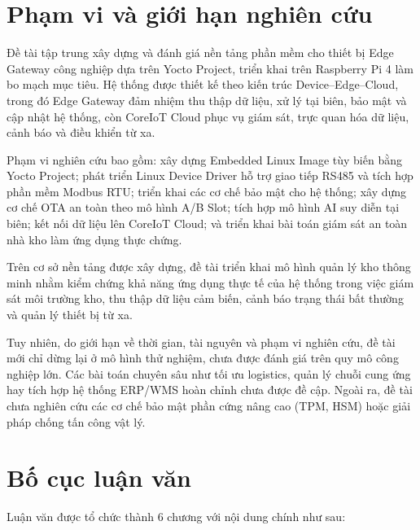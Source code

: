 \section{Phạm vi và giới hạn nghiên cứu}

Đề tài tập trung xây dựng và đánh giá nền tảng phần mềm cho thiết bị Edge Gateway công nghiệp dựa trên Yocto Project, triển khai trên Raspberry Pi 4 làm bo mạch mục tiêu. Hệ thống được thiết kế theo kiến trúc Device–Edge–Cloud, trong đó Edge Gateway đảm nhiệm thu thập dữ liệu, xử lý tại biên, bảo mật và cập nhật hệ thống, còn CoreIoT Cloud phục vụ giám sát, trực quan hóa dữ liệu, cảnh báo và điều khiển từ xa.

Phạm vi nghiên cứu bao gồm: xây dựng Embedded Linux Image tùy biến bằng Yocto Project; phát triển Linux Device Driver hỗ trợ giao tiếp RS485 và tích hợp phần mềm Modbus RTU; triển khai các cơ chế bảo mật cho hệ thống; xây dựng cơ chế OTA an toàn theo mô hình A/B Slot; tích hợp mô hình AI suy diễn tại biên; kết nối dữ liệu lên CoreIoT Cloud; và triển khai bài toán giám sát an toàn nhà kho làm ứng dụng thực chứng.

Trên cơ sở nền tảng được xây dựng, đề tài triển khai mô hình quản lý kho thông minh nhằm kiểm chứng khả năng ứng dụng thực tế của hệ thống trong việc giám sát môi trường kho, thu thập dữ liệu cảm biến, cảnh báo trạng thái bất thường và quản lý thiết bị từ xa.

Tuy nhiên, do giới hạn về thời gian, tài nguyên và phạm vi nghiên cứu, đề tài mới chỉ dừng lại ở mô hình thử nghiệm, chưa được đánh giá trên quy mô công nghiệp lớn. Các bài toán chuyên sâu như tối ưu logistics, quản lý chuỗi cung ứng hay tích hợp hệ thống ERP/WMS hoàn chỉnh chưa được đề cập. Ngoài ra, đề tài chưa nghiên cứu các cơ chế bảo mật phần cứng nâng cao (TPM, HSM) hoặc giải pháp chống tấn công vật lý. 

\section{Bố cục luận văn}

Luận văn được tổ chức thành 6 chương với nội dung chính như sau:

